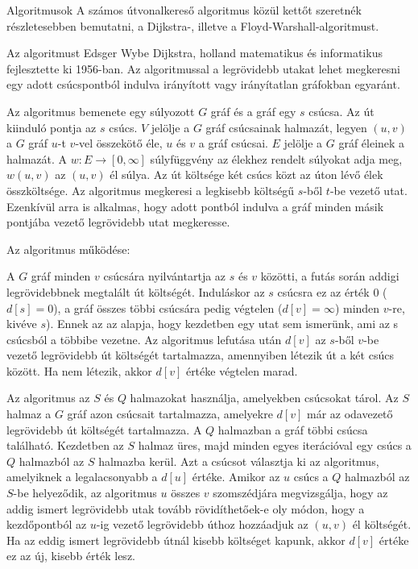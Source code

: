 Algoritmusok
A számos útvonalkereső algoritmus közül kettőt szeretnék részletesebben bemutatni, a Dijkstra-, illetve a Floyd-Warshall-algoritmust.


Az algoritmust Edsger Wybe Dijkstra, holland matematikus és informatikus fejlesztette ki 1956-ban. Az algoritmussal a legrövidebb utakat lehet megkeresni egy adott csúcspontból indulva irányított vagy irányítatlan gráfokban egyaránt.

Az algoritmus bemenete egy súlyozott $G$ gráf és a gráf egy $s$ csúcsa. Az út kiinduló pontja az $s$ csúcs. $V$ jelölje a $G$ gráf csúcsainak halmazát, legyen $(u, v)$ a $G$ gráf $u$-t $v$-vel összekötő éle, $u$ és $v$ a gráf csúcsai. $E$ jelölje a $G$ gráf éleinek a halmazát. A $w: E \rightarrow [0, \infty]$ súlyfüggvény az élekhez rendelt súlyokat adja meg, $w(u, v)$ az $(u, v)$ él súlya. Az út költsége két csúcs közt az úton lévő élek összköltsége. Az algoritmus megkeresi a legkisebb költségű $s$-ből $t$-be vezető utat. Ezenkívül arra is alkalmas, hogy adott pontból indulva a gráf minden másik pontjába vezető legrövidebb utat megkeresse.

Az algoritmus működése:

A $G$ gráf minden $v$ csúcsára nyilvántartja az $s$ és $v$ közötti, a futás során addigi legrövidebbnek megtalált út költségét. Induláskor az $s$ csúcsra ez az érték $0$ ($d[s] = 0$), a gráf összes többi csúcsára pedig végtelen ($d[v] = \infty$) minden $v$-re, kivéve $s$). Ennek az az alapja, hogy kezdetben egy utat sem ismerünk, ami az s csúcsból a többibe vezetne. Az algoritmus lefutása után $d[v]$ az $s$-ből $v$-be vezető legrövidebb út költségét tartalmazza, amennyiben létezik út a két csúcs között. Ha nem létezik, akkor $d[v]$ értéke végtelen marad.

Az algoritmus az $S$ és $Q$ halmazokat használja, amelyekben csúcsokat tárol. Az $S$ halmaz a $G$ gráf azon csúcsait tartalmazza, amelyekre $d[v]$ már az odavezető legrövidebb út költségét tartalmazza. A $Q$ halmazban a gráf többi csúcsa található. Kezdetben az $S$ halmaz üres, majd minden egyes iterációval egy csúcs a $Q$ halmazból az $S$ halmazba kerül. Azt a csúcsot választja ki az algoritmus, amelyiknek a legalacsonyabb a $d[u]$ értéke. Amikor az $u$ csúcs a $Q$ halmazból az $S$-be helyeződik, az algoritmus $u$ összes $v$ szomszédjára megvizsgálja, hogy az addig ismert legrövidebb utak tovább rövidíthetőek-e oly módon, hogy a kezdőpontból az $u$-ig vezető legrövidebb úthoz hozzáadjuk az $(u, v)$ él költségét. Ha az eddig ismert legrövidebb útnál kisebb költséget kapunk, akkor $d[v]$ értéke ez az új, kisebb érték lesz.

